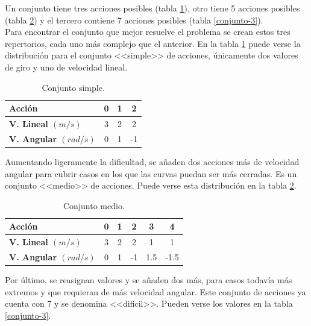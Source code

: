 Un conjunto tiene tres acciones posibles (tabla \ref{conjunto-1}), otro tiene 5 acciones posibles (tabla \ref{conjunto-2}) y el tercero contiene 7 acciones posibles (tabla \ref{conjunto-3}).\\

Para encontrar el conjunto que mejor resuelve el problema se crean estos tres repertorios, cada uno más complejo que el anterior. En la tabla \ref{conjunto-1} puede verse la distribución para el conjunto <<simple>> de acciones, únicamente dos valores de giro y uno de velocidad lineal.

\begin{table}[ht!]
\centering
\begin{tabular}{|l|c|c|c|}
\hline
\rowcolor[HTML]{EFEFEF} 
\textbf{Acción}                                       & \textbf{0} & \textbf{1} & \textbf{2} \\ \hline
\cellcolor[HTML]{EFEFEF}\textbf{V. Lineal $(m/s)$}    & 3          & 2          & 2          \\ \hline
\cellcolor[HTML]{EFEFEF}\textbf{V. Angular $(rad/s)$} & 0          & 1          & -1         \\ \hline
\end{tabular}
\caption{Conjunto simple.}\label{conjunto-1}
\end{table}

Aumentando ligeramente la dificultad, se añaden dos acciones más de velocidad angular para cubrir casos en los que las curvas puedan ser más cerradas. Es un conjunto <<medio>> de acciones. Puede verse esta distribución en la tabla \ref{conjunto-2}.

\begin{table}[]
\centering
\begin{tabular}{|l|c|c|c|c|c|}
\hline
\rowcolor[HTML]{EFEFEF} 
\textbf{Acción}                                       & \textbf{0} & \textbf{1} & \textbf{2} & \textbf{3} & \textbf{4} \\ \hline
\cellcolor[HTML]{EFEFEF}\textbf{V. Lineal $(m/s)$}    & 3          & 2          & 2          & 1          & 1          \\ \hline
\cellcolor[HTML]{EFEFEF}\textbf{V. Angular $(rad/s)$} & 0          & 1          & -1         & 1.5        & -1.5       \\ \hline
\end{tabular}
\caption{Conjunto medio.}\label{conjunto-2}
\end{table}

Por último, se reasignan valores y se añaden dos más, para casos todavía más extremos y que requieran de más velocidad angular. Este conjunto de acciones ya cuenta con 7 y se denomina <<dificil>>. Pueden verse los valores en la tabla \ref{conjunto-3}.

